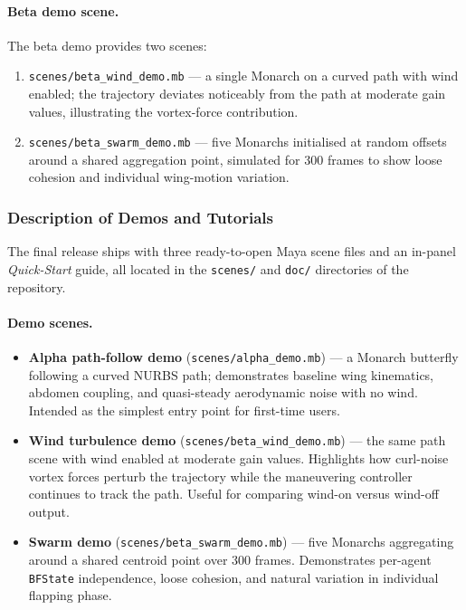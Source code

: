 \documentclass[12pt]{article}
\begin{document}
\paragraph{Beta demo scene.}
The beta demo provides two scenes:
\begin{enumerate}
  \item \texttt{scenes/beta\_wind\_demo.mb} --- a single Monarch on a curved path
    with wind enabled; the trajectory deviates noticeably from the path at moderate
    gain values, illustrating the vortex-force contribution.
  \item \texttt{scenes/beta\_swarm\_demo.mb} --- five Monarchs initialised at
    random offsets around a shared aggregation point, simulated for 300 frames to
    show loose cohesion and individual wing-motion variation.
\end{enumerate}

\subsubsection{Description of Demos and Tutorials}

The final release ships with three ready-to-open Maya scene files and an
in-panel \textit{Quick-Start} guide, all located in the \texttt{scenes/} and
\texttt{doc/} directories of the repository.

\paragraph{Demo scenes.}
\begin{itemize}
  \item \textbf{Alpha path-follow demo} (\texttt{scenes/alpha\_demo.mb}) ---
    a Monarch butterfly following a curved NURBS path; demonstrates baseline wing
    kinematics, abdomen coupling, and quasi-steady aerodynamic noise with no wind.
    Intended as the simplest entry point for first-time users.

  \item \textbf{Wind turbulence demo} (\texttt{scenes/beta\_wind\_demo.mb}) ---
    the same path scene with wind enabled at moderate gain values. Highlights how
    curl-noise vortex forces perturb the trajectory while the maneuvering controller
    continues to track the path. Useful for comparing wind-on versus wind-off output.

  \item \textbf{Swarm demo} (\texttt{scenes/beta\_swarm\_demo.mb}) ---
    five Monarchs aggregating around a shared centroid point over 300 frames.
    Demonstrates per-agent \texttt{BFState} independence, loose cohesion, and
    natural variation in individual flapping phase.
\end{itemize}
\end{document}
